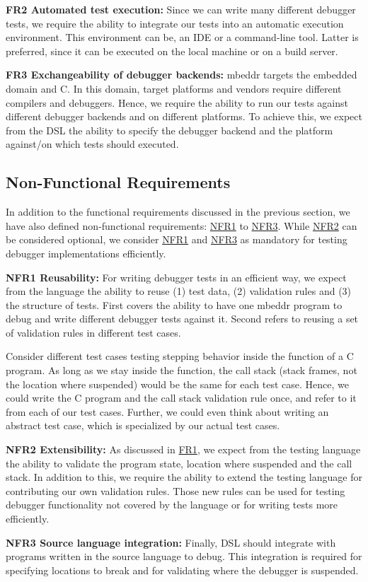 \noindent \textbf{\label{FR2}FR2 Automated test execution:} Since we can write
many different debugger tests, we require the ability to integrate our 
tests into an automatic execution environment. This environment can be, \eg
an \ac{IDE} or a command-line tool. Latter is preferred, since it can be
executed on the local machine or on a build server.

\noindent \textbf{\label{FR3}FR3 Exchangeability of debugger backends:}
mbeddr targets the embedded domain and C. In this domain, target platforms and
vendors require different compilers and debuggers. 
Hence, we require the ability to run our tests against
different debugger backends and on different platforms. To achieve this,
we expect from the \ac{DSL} the ability to specify the debugger backend
and the platform against/on which tests should executed.

\subsection{Non-Functional Requirements}

In addition to the functional requirements discussed in the previous section, we
have also defined non-functional requirements: \hyperref[NFR1]{NFR1} to
\hyperref[NFR3]{NFR3}. While \hyperref[NFR2]{NFR2} can be considered optional,
we consider \hyperref[NFR1]{NFR1} and \hyperref[NFR3]{NFR3} as mandatory for
testing debugger implementations efficiently.

\noindent \textbf{\label{NFR1}NFR1 Reusability:} For writing debugger tests in
an efficient way, we expect from the language the ability to reuse (1) test data, (2) 
validation rules and (3) the structure of tests. First covers the ability to
have one mbeddr program to debug and write different debugger tests against
it. Second refers to reusing a set of validation rules in different test cases.

Consider different test cases testing stepping behavior inside the  
function of a C program.
As long as we stay inside the function, the call stack (stack frames, not the
location where suspended) would be the same for each test case. Hence, we could
write the C program and the call stack validation rule once, and refer to it
from each of our test cases. Further, we could even think about writing
an abstract test case, which is specialized by our actual test cases.


\noindent \textbf{\label{NFR2}NFR2 Extensibility:} As discussed in
\hyperref[FR1]{FR1}, 
we expect from the testing language the ability to validate the program state, location where
suspended and the call stack. In addition to this, we
require the ability to extend the testing language for contributing our own
validation rules. Those new rules can be used for testing debugger
functionality not covered by the language or for writing tests more efficiently.

\noindent \textbf{\label{NFR3}NFR3 Source language integration:} Finally,
\ac{DSL} should integrate with programs written in the source language to debug.
This integration is required for specifying locations to break and for
validating where the debugger is suspended.

